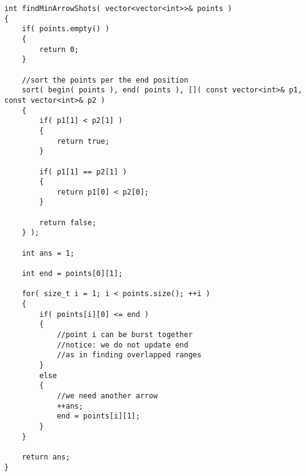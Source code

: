 \setcounter{lstlisting}{0}
\begin{lstlisting}[style=customc, caption={Greedy}]
int findMinArrowShots( vector<vector<int>>& points )
{
    if( points.empty() )
    {
        return 0;
    }

    //sort the points per the end position
    sort( begin( points ), end( points ), []( const vector<int>& p1, const vector<int>& p2 )
    {
        if( p1[1] < p2[1] )
        {
            return true;
        }

        if( p1[1] == p2[1] )
        {
            return p1[0] < p2[0];
        }

        return false;
    } );

    int ans = 1;

    int end = points[0][1];

    for( size_t i = 1; i < points.size(); ++i )
    {
        if( points[i][0] <= end )
        {
            //point i can be burst together
            //notice: we do not update end
            //as in finding overlapped ranges
        }
        else
        {
            //we need another arrow
            ++ans;
            end = points[i][1];
        }
    }

    return ans;
}
\end{lstlisting}